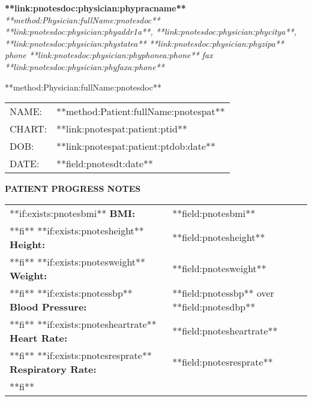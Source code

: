\documentclass{article}
\newcommand{\sheading}[1]{\textbf{#1:}}
\begin{document}
\begin{center}
        {\textbf{**link:pnotesdoc:physician:phypracname**}} \\
        {\textsl{**method:Physician:fullName:pnotesdoc**}} \\
        \textsl{**link:pnotesdoc:physician:phyaddr1a**, **link:pnotesdoc:physician:phycitya**, **link:pnotesdoc:physician:phystatea** **link:pnotesdoc:physician:phyzipa** } \\
        \textsl{phone **link:pnotesdoc:physician:phyphonea:phone** fax **link:pnotesdoc:physician:phyfaxa:phone**}
\end{center}

**method:Physician:fullName:pnotesdoc** \\
\begin{tabular}{ll}
	NAME:	&	**method:Patient:fullName:pnotespat**	\\
	CHART:	&	**link:pnotespat:patient:ptid** 	\\
	DOB:	&	**link:pnotespat:patient:ptdob:date**	\\
	DATE:	&	**field:pnotesdt:date**
\end{tabular}

\begin{center}
	{\textbf{PATIENT PROGRESS NOTES}}
\end{center}

\begin{tabular}{ll}
**if:exists:pnotesbmi**
\sheading{BMI} & **field:pnotesbmi** \\
**fi**
**if:exists:pnotesheight**
\sheading{Height} & **field:pnotesheight** \\
**fi**
**if:exists:pnotesweight**
\sheading{Weight} & **field:pnotesweight** \\
**fi**
**if:exists:pnotessbp**
\sheading{Blood Pressure} & **field:pnotessbp** over **field:pnotesdbp** \\
**fi**
**if:exists:pnotesheartrate**
\sheading{Heart Rate} & **field:pnotesheartrate** \\
**fi**
**if:exists:pnotesresprate**
\sheading{Respiratory Rate} & **field:pnotesresprate** \\
**fi**
\  &  \  
\end{tabular} \\
\par
\end{document}
